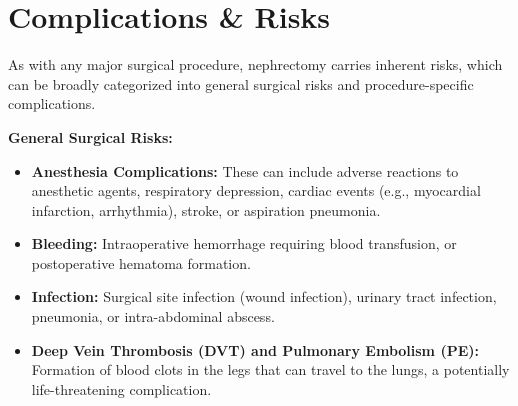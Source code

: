 \section*{Complications \& Risks}
As with any major surgical procedure, nephrectomy carries inherent risks, which can be broadly categorized into general surgical risks and procedure-specific complications.

\textbf{General Surgical Risks:}
\begin{itemize}
  \item \textbf{Anesthesia Complications:} These can include adverse reactions to anesthetic agents, respiratory depression, cardiac events (e.g., myocardial infarction, arrhythmia), stroke, or aspiration pneumonia.
  \item \textbf{Bleeding:} Intraoperative hemorrhage requiring blood transfusion, or postoperative hematoma formation.
  \item \textbf{Infection:} Surgical site infection (wound infection), urinary tract infection, pneumonia, or intra-abdominal abscess.
  \item \textbf{Deep Vein Thrombosis (DVT) and Pulmonary Embolism (PE):} Formation of blood clots in the legs that can travel to the lungs, a potentially life-threatening complication.
\end{itemize}

